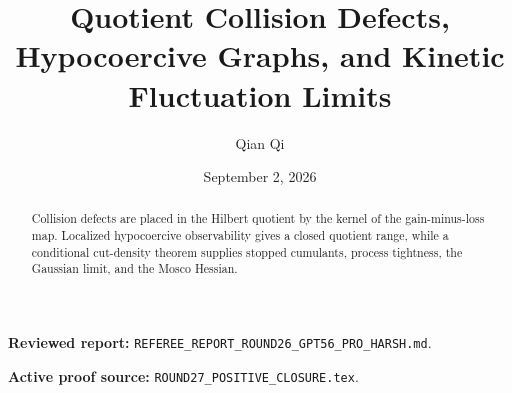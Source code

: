 \documentclass[11pt,reqno]{amsart}
\title[B3 Round 27 revision]{Quotient Collision Defects, Hypocoercive Graphs, and Kinetic Fluctuation Limits}
\author{Qian Qi}
\date{September 2, 2026}
\begin{document}
\begin{abstract}Collision defects are placed in the Hilbert quotient by the kernel of the gain-minus-loss map. Localized hypocoercive observability gives a closed quotient range, while a conditional cut-density theorem supplies stopped cumulants, process tightness, the Gaussian limit, and the Mosco Hessian.\end{abstract}
\maketitle
\noindent\textbf{Reviewed report:} \texttt{REFEREE\_REPORT\_ROUND26\_GPT56\_PRO\_HARSH.md}.\par
\noindent\textbf{Active proof source:} \texttt{ROUND27\_POSITIVE\_CLOSURE.tex}.\par

\end{document}
